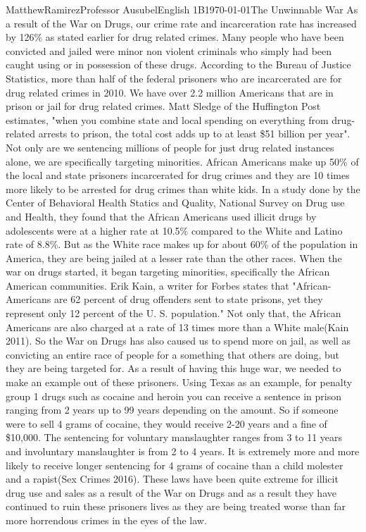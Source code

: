 \documentclass[12pt,letterpaper]{article}
\begin{document}
\begin{mla}{Matthew}{Ramirez}{Professor Ausubel}{English 1B}{\today}{The Unwinnable War}
As a result of the War on Drugs, our crime rate and incarceration rate has increased by 126\% as stated earlier for drug related crimes. Many people who have been convicted and jailed were minor non violent criminals who simply had been caught using or in possession of these drugs. According to the Bureau of Justice Statistics, more than half of the federal prisoners who are incarcerated are for drug related crimes in 2010. We have over 2.2 million Americans that are in prison or jail for drug related crimes. Matt Sledge of the Huffington Post estimates, "when you combine state and local spending on everything from drug-related arrests to prison, the total cost adds up to at least \$51 billion per year". Not only are we sentencing millions of people for just drug related instances alone, we are specifically targeting minorities. African Americans make up 50\% of the local and state prisoners incarcerated for drug crimes and they are 10 times more likely to be arrested for drug crimes than white kids. In a study done by the Center of Behavioral Health Statics and Quality, National Survey on Drug use and Health, they found that the African Americans used illicit drugs by adolescents were at a higher rate at 10.5\% compared to the White and Latino rate of 8.8\%. But as the White race makes up for about 60\% of the population in America, they are being jailed at a lesser rate than the other races. When the war on drugs started, it began targeting minorities, specifically the African American communities. Erik Kain, a writer for Forbes states that "African-Americans are 62 percent of drug offenders sent to state prisons, yet they represent only 12 percent of the U. S. population." Not only that, the African Americans are also charged at a rate of 13 times more than a White male(Kain 2011). So the War on Drugs has also caused us to spend more on jail, as well as convicting an entire race of people for a something that others are doing, but they are being targeted for. As a result of having this huge war, we needed to make an example out of these prisoners. Using Texas as an example, for penalty group 1 drugs such as cocaine and heroin you can receive a sentence in prison ranging from 2 years up to 99 years depending on the amount. So if someone were to sell 4 grams of cocaine, they would receive 2-20 years and a fine of \$10,000. The sentencing for voluntary manslaughter ranges from 3 to 11 years and involuntary manslaughter is from 2 to 4 years. It is extremely more and more likely to receive longer sentencing for 4 grams of cocaine than a child molester and a rapist(Sex Crimes 2016). These laws have been quite extreme for illicit drug use and sales as a result of  the War on Drugs and as a result they have continued to ruin these prisoners lives as they are being treated worse than far more horrendous crimes in the eyes of the law.\\

\end{mla}
\end{document}
